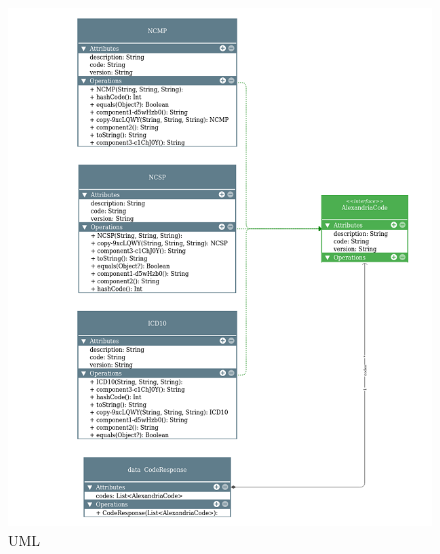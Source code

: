 \newpage
\begin{figure}[ht]
    \centering    \includegraphics{images/uml2.png}
    \caption{UML}
    \label{fig:my_label}
\end{figure}


